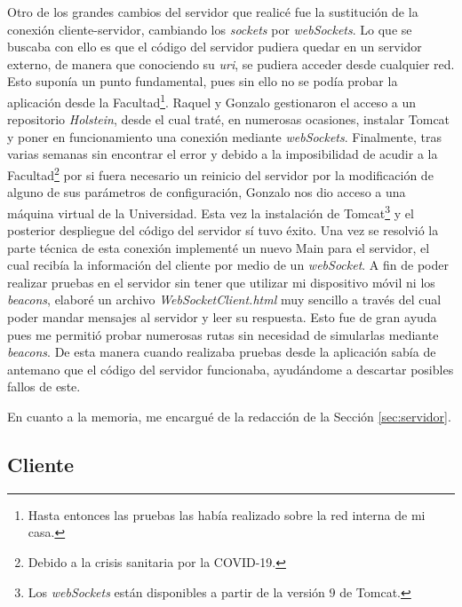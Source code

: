 Otro de los grandes cambios del servidor que realicé fue la sustitución de la conexión cliente-servidor, cambiando los \textit{sockets} por \textit{webSockets}. Lo que se buscaba con ello es que el código del servidor pudiera quedar en un servidor externo, de manera que conociendo su \textit{uri}, se pudiera acceder desde cualquier red. Esto suponía un punto fundamental, pues sin ello no se podía probar la aplicación desde la Facultad\footnote{Hasta entonces las pruebas las había realizado sobre la red interna de mi casa.}. Raquel y Gonzalo gestionaron el acceso a un repositorio \textit{Holstein}, desde el cual traté, en numerosas ocasiones, instalar Tomcat y poner en funcionamiento una conexión mediante \textit{webSockets}. Finalmente, tras varias semanas sin encontrar el error y debido a la imposibilidad de acudir a la Facultad\footnote{Debido a la crisis sanitaria por la COVID-19.} por si fuera necesario un reinicio del servidor por la modificación de alguno de sus parámetros de configuración, Gonzalo nos dio acceso a una máquina virtual de la Universidad. Esta vez la instalación de Tomcat\footnote{Los \textit{webSockets} están disponibles a partir de la versión $9$ de Tomcat.} y el posterior despliegue del código del servidor sí tuvo éxito. Una vez se resolvió la parte técnica de esta conexión implementé un nuevo Main para el servidor, el cual recibía la información del cliente por medio de un \textit{webSocket}. A fin de poder realizar pruebas en el servidor sin tener que utilizar mi dispositivo móvil ni los \textit{beacons}, elaboré un archivo \textit{WebSocketClient.html} muy sencillo a través del cual poder mandar mensajes al servidor y leer su respuesta. Esto fue de gran ayuda pues me permitió probar numerosas rutas sin necesidad de simularlas mediante \textit{beacons}. De esta manera cuando realizaba pruebas desde la aplicación sabía de antemano que el código del servidor funcionaba, ayudándome a descartar posibles fallos de este. 


En cuanto a la memoria, me encargué de la redacción de la Sección \ref{sec:servidor}.

\subsection{Cliente}

